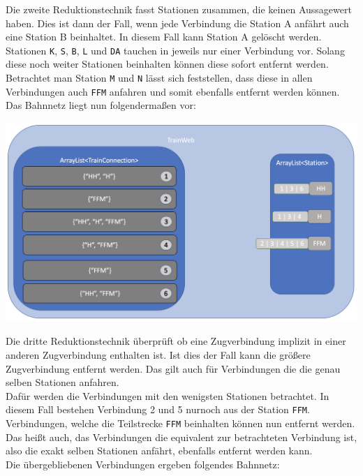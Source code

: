 Die zweite Reduktionstechnik fasst Stationen zusammen, die keinen Aussagewert haben. Dies ist dann der Fall, wenn jede Verbindung die Station A anfährt auch eine Station B beinhaltet. In diesem Fall kann Station A gelöscht werden.\\
Stationen \texttt{K}, \texttt{S}, \texttt{B}, \texttt{L} und \texttt{DA} tauchen in jeweils nur einer Verbindung vor. Solang diese noch weiter Stationen beinhalten können diese sofort entfernt werden. Betrachtet man Station \texttt{M} und \texttt{N} lässt sich feststellen, dass diese in allen Verbindungen auch \texttt{FFM} anfahren und somit ebenfalls entfernt werden können.\\
Das Bahnnetz liegt nun folgendermaßen vor:\\

\begin{center}
    \includegraphics[width=\linewidth]{images/Programmdurchlauf/Datenstruktur02.png}
    \label{test:subsecpar:datenstruktur2}
\end{center}

Die dritte Reduktionstechnik überprüft ob eine Zugverbindung implizit in einer anderen Zugverbindung enthalten ist. Ist dies der Fall kann die größere Zugverbindung entfernt werden. Das gilt auch für Verbindungen die die genau selben Stationen anfahren.\\
Dafür werden die Verbindungen mit den wenigsten Stationen betrachtet. In diesem Fall bestehen Verbindung 2 und 5 nurnoch aus der Station \texttt{FFM}. Verbindungen, welche die Teilstrecke \texttt{FFM} beinhalten können nun entfernt werden. Das heißt auch, das Verbindungen die equivalent zur betrachteten Verbindung ist, also die exakt selben Stationen anfährt, ebenfalls entfernt werden kann.\\
Die übergebliebenen Verbindungen ergeben folgendes Bahnnetz:\\

